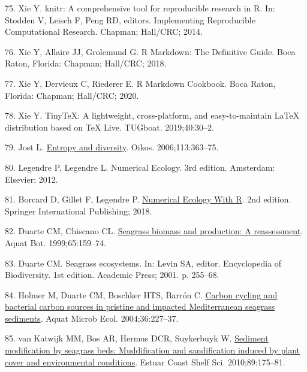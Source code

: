 \documentclass[
  12 pt,
]{article}
\newlength{\cslhangindent}
\newlength{\cslentryspacingunit} %
\newenvironment{CSLReferences}[2] %
 {%
  \setlength{\parindent}{0pt}
  \ifodd #1
  \let\oldpar\par
  \def\par{\hangindent=\cslhangindent\oldpar}
  \fi
  \setlength{\parskip}{#2\cslentryspacingunit}
 }%
 {}
\begin{document}
\begin{CSLReferences}{0}{0}
\leavevmode{}%
75. Xie Y. {knitr}: A comprehensive tool for reproducible research in {R}. In: Stodden V, Leisch F, Peng RD, editors. {Implementing Reproducible Computational Research}. Chapman; Hall/CRC; 2014.

\leavevmode{}%
76. Xie Y, Allaire JJ, Grolemund G. {R {Markdown}: The Definitive Guide}. Boca Raton, Florida: Chapman; Hall/CRC; 2018.

\leavevmode{}%
77. Xie Y, Dervieux C, Riederer E. {R {Markdown} Cookbook}. Boca Raton, Florida: Chapman; Hall/CRC; 2020.

\leavevmode{}%
78. Xie Y. TinyTeX: A lightweight, cross-platform, and easy-to-maintain LaTeX distribution based on {TeX Live}. TUGboat. 2019;40:30--2.

\leavevmode{}%
79. Jost L. \href{https://doi.org/10.1111/j.2006.0030-1299.14714.x}{Entropy and diversity}. Oikos. 2006;113:363--75.

\leavevmode{}%
80. Legendre P, Legendre L. Numerical {Ecology}. 3rd edition. Amsterdam: Elsevier; 2012.

\leavevmode{}%
81. Borcard D, Gillet F, Legendre P. \href{https://doi.org/10.1007/978-3-319-71404-2}{Numerical {Ecology With R}}. 2nd edition. Springer International Publishing; 2018.

\leavevmode{}%
82. Duarte CM, Chiscano CL. \href{https://doi.org/10.1016/S0304-3770(99)00038-8}{Seagrass biomass and production: A reassessment}. Aquat Bot. 1999;65:159--74.

\leavevmode{}%
83. Duarte CM. Seagrass ecosystems. In: Levin SA, editor. Encyclopedia of {Biodiversity}. 1st edition. Academic Press; 2001. p. 255--68.

\leavevmode{}%
84. Holmer M, Duarte CM, Boschker HTS, Barrón C. \href{https://doi.org/10.3354/ame036227}{Carbon cycling and bacterial carbon sources in pristine and impacted {Mediterranean} seagrass sediments}. Aquat Microb Ecol. 2004;36:227--37.

\leavevmode{}%
85. van Katwijk MM, Bos AR, Hermus DCR, Suykerbuyk W. \href{https://doi.org/10.1016/j.ecss.2010.06.008}{Sediment modification by seagrass beds: Muddification and sandification induced by plant cover and environmental conditions}. Estuar Coast Shelf Sci. 2010;89:175--81.


\end{CSLReferences}
\end{document}
